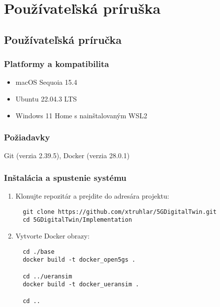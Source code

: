 \setcounter{figure}{0}
\setcounter{listing}{0}

\chapter{Používateľská príruška}
\label{appendix:userguide}
\renewcommand*{\thepage}{A-\arabic{page}}

\begin{refsegment}

\section*{Používateľská príručka}

\subsection*{Platformy a kompatibilita}
\begin{itemize}
  \item macOS Sequoia 15.4
  \item Ubuntu 22.04.3 LTS
  \item Windows 11 Home s nainštalovaným WSL2
\end{itemize}

\subsection*{Požiadavky}
Git (verzia 2.39.5), Docker (verzia 28.0.1)


\subsection*{Inštalácia a spustenie systému}
\begin{enumerate}
  \item Klonujte repozitár a prejdite do adresára projektu:
  \begin{verbatim}
  git clone https://github.com/xtruhlar/5GDigitalTwin.git
  cd 5GDigitalTwin/Implementation
  \end{verbatim}

  \item Vytvorte Docker obrazy:
  \begin{verbatim}
  cd ./base
  docker build -t docker_open5gs .

  cd ../ueransim
  docker build -t docker_ueransim .

  cd ..
  \end{verbatim}


\end{enumerate}
\end{refsegment}
